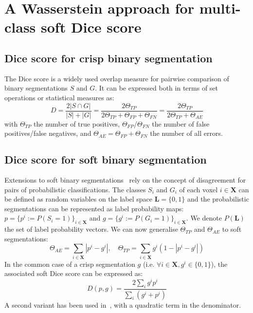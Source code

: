 \documentclass[runningheads,orivec,a4paper]{llncs}
\begin{document}
\section{A Wasserstein approach for multi-class soft Dice score}

\subsection{Dice score for crisp binary segmentation}
The Dice score is a widely used overlap measure for pairwise comparison of binary segmentations $S$ and $G$. It can be expressed both in terms of set operations or statistical measures as:
\begin{equation}\label{dice}
D = \frac{2|S \cap G|}{|S| + |G|} = \frac{2\Theta_{TP}}{2\Theta_{TP} + \Theta_{FP} + \Theta_{FN}} = \frac{2\Theta_{TP}}{2\Theta_{TP} + \Theta_{AE}}
\end{equation}
with $\Theta_{TP}$ the number of true positives, $\Theta_{FP}$/$\Theta_{FN}$ the number of false positives/false negatives, and $\Theta_{AE}=\Theta_{FP}+\Theta_{FN}$ the number of all errors.

\subsection{Dice score for soft binary segmentation}
Extensions to soft binary
segmentations~\cite{Anbeek2005,chang2009performance} rely on the
concept of disagreement for pairs of probabilistic classifications.
The classes $S_i$ and $G_i$ of each voxel $i \in \mathbf{X}$ can be defined
as random variables on the label space $\mathbf{L}=\{0,1\}$ and the
probabilistic segmentations can be represented as label probability
maps: $p=\{p^i:=P(S_i=1)\}_{i \in \mathbf{X}}$ and
$g=\{g^i:=P(G_i=1)\}_{i \in \mathbf{X}}$. 
We denote $P({\mathbf{L}})$ the set of label
probability vectors.
We can now generalise $\Theta_{TP}$ and $\Theta_{AE}$ to soft
segmentations:
\begin{equation}\label{soft_dsc}
\Theta_{AE} = \sum_{i \in \mathbf{X}} |p^i - g^i|, \quad
\Theta_{TP} = \sum_{i \in \mathbf{X}}g^i(1 - |p^i - g^i|)
\end{equation}
In the common case of a crisp segmentation $g$ (i.e. $\forall i \in \mathbf{X}, g^i \in \{0,1\}$), the associated soft Dice score can be expressed as:
\begin{equation}
D(p,g) = \frac{2\sum_i g^ip^i}{\sum_i (g^i + p^i)}
\end{equation}
A second variant has been used in~\cite{v_net}, with a quadratic term in the denominator.
\end{document}

